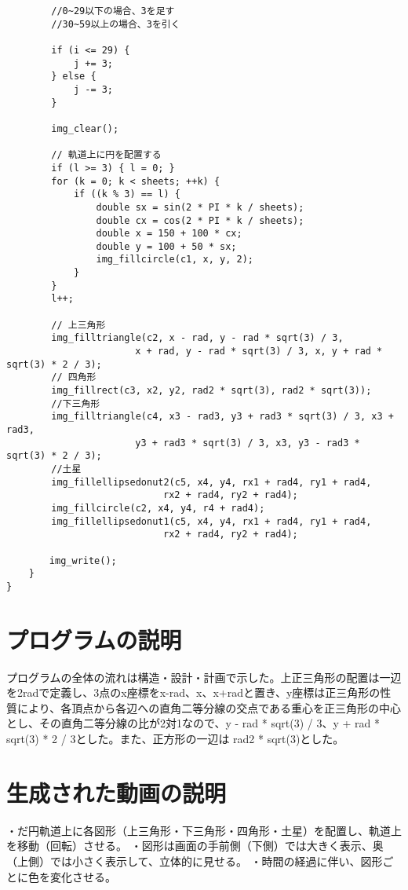 \documentclass[12pt,a4j]{jarticle}
\begin{document}
\begin{verbatim}
        //0~29以下の場合、3を足す
        //30~59以上の場合、3を引く

        if (i <= 29) {
            j += 3;
        } else {
            j -= 3;
        }

        img_clear();

        // 軌道上に円を配置する
        if (l >= 3) { l = 0; }
        for (k = 0; k < sheets; ++k) {
            if ((k % 3) == l) {
                double sx = sin(2 * PI * k / sheets);
                double cx = cos(2 * PI * k / sheets);
                double x = 150 + 100 * cx;
                double y = 100 + 50 * sx;
                img_fillcircle(c1, x, y, 2);
            }
        }
        l++;

        // 上三角形
        img_filltriangle(c2, x - rad, y - rad * sqrt(3) / 3, 
        　　　　　　　　　x + rad, y - rad * sqrt(3) / 3, x, y + rad * sqrt(3) * 2 / 3);
        // 四角形
        img_fillrect(c3, x2, y2, rad2 * sqrt(3), rad2 * sqrt(3));
        //下三角形
        img_filltriangle(c4, x3 - rad3, y3 + rad3 * sqrt(3) / 3, x3 + rad3,
        　　　　　　　　　y3 + rad3 * sqrt(3) / 3, x3, y3 - rad3 * sqrt(3) * 2 / 3);
        //土星
        img_fillellipsedonut2(c5, x4, y4, rx1 + rad4, ry1 + rad4, 
        　　　　　　　　　　　　rx2 + rad4, ry2 + rad4);
        img_fillcircle(c2, x4, y4, r4 + rad4);
        img_fillellipsedonut1(c5, x4, y4, rx1 + rad4, ry1 + rad4, 
        　　　　　　　　　　　　rx2 + rad4, ry2 + rad4);

      　img_write();
    }
}

\end{verbatim}

\section{プログラムの説明}

プログラムの全体の流れは構造・設計・計画で示した。上正三角形の配置は一辺を2radで定義し、3点のx座標をx-rad、x、x+radと置き、y座標は正三角形の性質により、各頂点から各辺への直角二等分線の交点である重心を正三角形の中心とし、その直角二等分線の比が2対1なので、y - rad * sqrt(3) / 3、y + rad * sqrt(3) * 2 / 3とした。また、正方形の一辺は rad2 * sqrt(3)とした。

\section{生成された動画の説明} 
\begin{itemize}
・だ円軌道上に各図形（上三角形・下三角形・四角形・土星）を配置し、軌道上を移動（回転）させる。
・図形は画面の手前側（下側）では大きく表示、奥（上側）では小さく表示して、立体的に見せる。
・時間の経過に伴い、図形ごとに色を変化させる。
\end{itemize}
\end{document}
